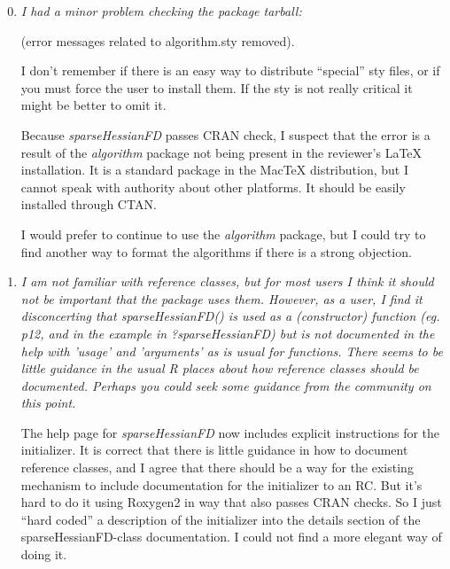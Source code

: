 \documentclass{article}
\newcommand{\pkg}[1]{\emph{#1}}
\newenvironment{revQuote}{\itshape}{\vspace{\baselineskip}}
\newenvironment{response}{\normalfont}{\vspace{\baselineskip}}
\begin{document}
\begin{enumerate}[align=left]
 \setcounter{enumi}{-1}

\item \begin{revQuote}
I had a minor problem checking the package tarball:

(error messages related to algorithm.sty removed).

I don't remember if there is an easy way to distribute ``special'' sty files,
or if you must force the user to install them. If the sty is not really
critical it might be better to omit it.  
  
\end{revQuote}

\begin{response}
Because \pkg{sparseHessianFD} passes CRAN check, I suspect that the
error is a result of the \pkg{algorithm} package
not being present in the reviewer's LaTeX installation.  It is a standard
package in the MacTeX distribution, but I cannot speak with authority about other
platforms. It should be easily installed through CTAN.

I would prefer to continue to use the \pkg{algorithm} package, but I
could try to find another way to format the algorithms if there is a
strong objection.
\end{response}

\item \begin{revQuote}
I am not familiar with reference classes, but for most users I think it
should not be important that the package uses them. However, as a user, I
find it disconcerting that sparseHessianFD() is used as a (constructor)
function (eg. p12, and in the example in ?sparseHessianFD) but is not
documented in the help with 'usage' and 'arguments' as is usual for
functions. There seems to be little guidance in the usual R places about how
reference classes should be documented. Perhaps you could seek some guidance
from the community on this point.
\end{revQuote}


\begin{response}
The help page for \pkg{sparseHessianFD} now includes explicit
instructions for the initializer.  It is correct that there is
little guidance in how to document reference classes, and I agree that
there should be a way for the
existing mechanism to include documentation for the initializer to
an RC.  But it's hard to do it using Roxygen2 in way that also passes
CRAN checks. So I just ``hard coded'' a description of the initializer
into the details section of the sparseHessianFD-class documentation. I
could not find a more elegant way of doing it.  
\end{response}




\end{enumerate}
\end{document}
